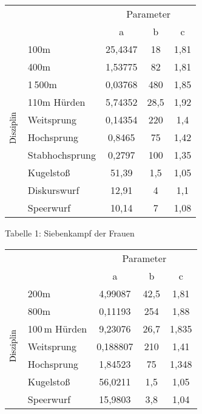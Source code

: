 \begin{langesbeispiel}
\begin{center}
	\begin{tabular}{|l|l|c|c|c|}\cline{3-5}
		\multicolumn{1}{c}{}&\multicolumn{1}{c}{}&\multicolumn{3}{|c|}{Parameter}\\ \cline{3-5}
		\multicolumn{1}{c}{}&\multicolumn{1}{c|}{}&a&b&c\\ \hline
		\multirow{11}{0.4cm}{$\rotatebox{90}{\text{Disziplin}}$}&100m&25,4347&18&1,81\\ \cline{2-5}
		&400m&1,53775&82&1,81\\ \cline{2-5}
		&1\,500m&0,03768&480&1,85\\ \cline{2-5}
		&110m Hürden&5,74352&28,5&1,92\\ \cline{2-5}
		&Weitsprung&0,14354&220&1,4\\ \cline{2-5}
		&Hochsprung&0,8465&75&1,42\\ \cline{2-5}
		&Stabhochsprung&0,2797&100&1,35\\ \cline{2-5}
		&Kugelstoß&51,39&1,5&1,05\\ \cline{2-5}
		&Diskurswurf&12,91&4&1,1\\ \cline{2-5}
		&Speerwurf&10,14&7&1,08\\ \hline
	\end{tabular}
\end{center}

Tabelle 1: Siebenkampf der Frauen

\begin{center}
	\begin{tabular}{|l|l|c|c|c|}\cline{3-5}
		\multicolumn{1}{c}{}&\multicolumn{1}{c}{}&\multicolumn{3}{|c|}{Parameter}\\ \cline{3-5}
		\multicolumn{1}{c}{}&\multicolumn{1}{c|}{}&a&b&c\\ \hline
		\multirow{7}{0.4cm}{$\rotatebox{90}{\text{Disziplin}}$}&200m&4,99087&42,5&1,81\\ \cline{2-5}
		&800m&0,11193&254&1,88\\ \cline{2-5}
		&100\,m Hürden&9,23076&26,7&1,835\\ \cline{2-5}
		&Weitsprung&0,188807&210&1,41\\ \cline{2-5}
		&Hochsprung&1,84523&75&1,348\\ \cline{2-5}
		&Kugelstoß&56,0211&1,5&1,05\\ \cline{2-5}
		&Speerwurf&15,9803&3,8&1,04\\ \hline
	\end{tabular}
\end{center}


\end{langesbeispiel}
